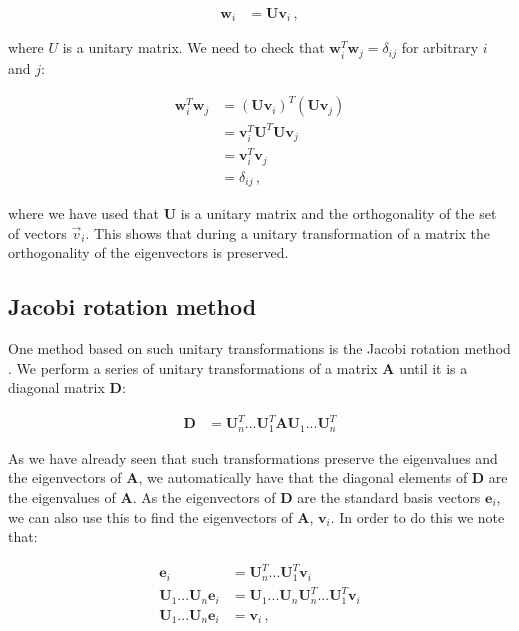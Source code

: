 \documentclass[reprint,english,notitlepage]{revtex4-1}  %
\begin{document}
\begin{align*}
\textbf{w}_i &= \textbf{U} \textbf{v}_i \, ,
\end{align*}

where $U$ is a unitary matrix. We need to check that $\textbf{w}_i^T \textbf{w}_j = \delta_{ij}$ for arbitrary $i$ and $j$:

\begin{align*}
\textbf{w}_i^T \textbf{w}_j &= (\textbf{U}\textbf{v}_i)^T (\textbf{U}\textbf{v}_j) \\
&= \textbf{v}_i^T \textbf{U}^T \textbf{U} \textbf{v}_j \\
&= \textbf{v}_i^T \textbf{v}_j \\
&= \delta_{ij} \, ,
\end{align*}

where we have used that $\textbf{U}$ is a unitary matrix and the orthogonality of the set of vectors $\vec{v}_i$. This shows that during a unitary transformation of a matrix the orthogonality of the eigenvectors is preserved. 


\subsection{Jacobi rotation method} \label{sec:II:b}

One method based on such unitary transformations is the Jacobi rotation method \citep{Jacobi1846}. We perform a series of unitary transformations of a matrix \textbf{A} until it is a diagonal matrix \textbf{D}:

\begin{align*}
\textbf{D} &= \textbf{U}_n^T ... \textbf{U}_1^T \textbf{AU}_1 ... \textbf{U}_n^T
\end{align*}  

As we have already seen that such transformations preserve the eigenvalues and the eigenvectors of \textbf{A}, we automatically have that the diagonal elements of \textbf{D} are the eigenvalues of \textbf{A}. As the eigenvectors of \textbf{D} are the standard basis vectors $\textbf{e}_i$, we can also use this to find the eigenvectors of \textbf{A}, $\textbf{v}_i$. In order to do this we note that:

\begin{align*}
\textbf{e}_i &= \textbf{U}_n^T ... \textbf{U}_1^T \textbf{v}_i \\
\textbf{U}_1 ... \textbf{U}_n \textbf{e}_i &= \textbf{U}_1 ... \textbf{U}_n \textbf{U}_n^T ... \textbf{U}_1^T \textbf{v}_i \\
\textbf{U}_1 ... \textbf{U}_n \textbf{e}_i &= \textbf{v}_i \, ,
\end{align*}
\end{document}
